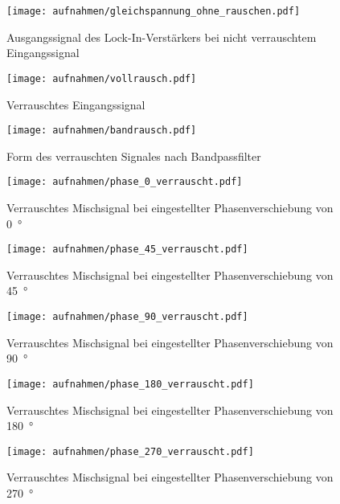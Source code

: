 \begin{figure}
  \centering
  \label{fig:gleichspannung_ohne_rausch}
  \texttt{[image: aufnahmen/gleichspannung\_ohne\_rauschen.pdf]}
  \caption{Ausgangssignal des Lock-In-Verstärkers bei nicht verrauschtem
    Eingangssignal}
\end{figure}


\begin{figure}
  \centering
  \label{fig:vollrausch}
  \texttt{[image: aufnahmen/vollrausch.pdf]}
  \caption{Verrauschtes Eingangssignal}
\end{figure}

\begin{figure}
  \centering
  \label{fig:bandrausch}
  \texttt{[image: aufnahmen/bandrausch.pdf]}
  \caption{Form des verrauschten Signales nach Bandpassfilter}
\end{figure}

\begin{figure}
  \centering
  \label{fig:phase_0_verrauscht}
  \texttt{[image: aufnahmen/phase\_0\_verrauscht.pdf]}
  \caption{Verrauschtes Mischsignal bei eingestellter Phasenverschiebung
    von \SI{0}{\degree}}
\end{figure}

\begin{figure}
  \centering
  \label{fig:phase_45_verrauscht}
  \texttt{[image: aufnahmen/phase\_45\_verrauscht.pdf]}
  \caption{Verrauschtes Mischsignal bei eingestellter Phasenverschiebung
    von \SI{45}{\degree}}
\end{figure}

\begin{figure}
  \centering
  \label{fig:phase_90_verrauscht}
  \texttt{[image: aufnahmen/phase\_90\_verrauscht.pdf]}
  \caption{Verrauschtes Mischsignal bei eingestellter Phasenverschiebung
    von \SI{90}{\degree}}
\end{figure}

\begin{figure}
  \centering
  \label{fig:phase_180_verrauscht}
  \texttt{[image: aufnahmen/phase\_180\_verrauscht.pdf]}
  \caption{Verrauschtes Mischsignal bei eingestellter Phasenverschiebung
    von \SI{180}{\degree}}
\end{figure}

\begin{figure}
  \centering
  \label{fig:phase_270_verrauscht}
  \texttt{[image: aufnahmen/phase\_270\_verrauscht.pdf]}
  \caption{Verrauschtes Mischsignal bei eingestellter Phasenverschiebung
    von \SI{270}{\degree}}
\end{figure}
